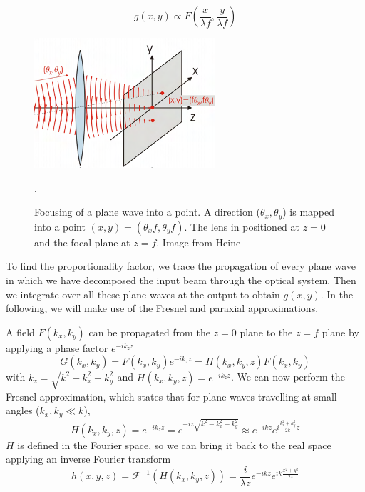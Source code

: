 \begin{equation}
    g(x,y) \propto F\left(\frac{x}{\lambda f}, \frac{y}{\lambda f}\right)
\end{equation}

\begin{figure}
    \centering
    \includegraphics[width=0.6\textwidth]{chapters/chapter_2/figures/fourier.png}
    \caption{Focusing of a plane wave into a point. A direction ($\theta_x, \theta_y$) is mapped into a point $(x,y) = (\theta_x f, \theta_y f)$. The lens in positioned at $z=0$ and the focal plane at $z=f$. Image from Heine \cite{article}}.
    \label{fig:fourier}
\end{figure}

To find the proportionality factor, we trace the propagation of every plane wave in which we have decomposed the input beam through the optical system. Then we integrate over all these plane waves at the output to obtain $g(x,y)$. In the following, we will make use of the Fresnel and paraxial approximations.

A field $F(k_x,k_y)$ can be propagated from the $z=0$ plane to the $z=f$ plane by applying a phase factor $e^{-ik_zz}$
\begin{equation}
    G(k_x, k_y) = F(k_x,k_y) e^{-ik_zz} = H(k_x, k_y, z) F(k_x, k_y)
\end{equation}
with $k_z = \sqrt{k^2 - k_x^2 - k_y^2}$ and  $H(k_x, k_y, z) = e^{-ik_zz}$. We can now perform the Fresnel approximation, which states that for plane waves travelling at small angles ($k_x, k_y \ll k$),
\begin{equation}
    H(k_x, k_y, z) = e^{-ik_zz} = e^{-iz\sqrt{k^2 - k_x^2 - k_y^2}} \approx e^{-ikz}e^{i\frac{k_x^2 + k_y^2}{2k}z}
\end{equation}
$H$ is defined in the Fourier space, so we can bring it back to the real space applying an inverse Fourier transform
\begin{equation}
    h(x,y,z) = \mathcal{F}^{-1}(H(k_x, k_y, z)) = \frac{i}{\lambda z} e^{-ikz} e^{ik\frac{x^2+y^2}{2z}}
\end{equation}

